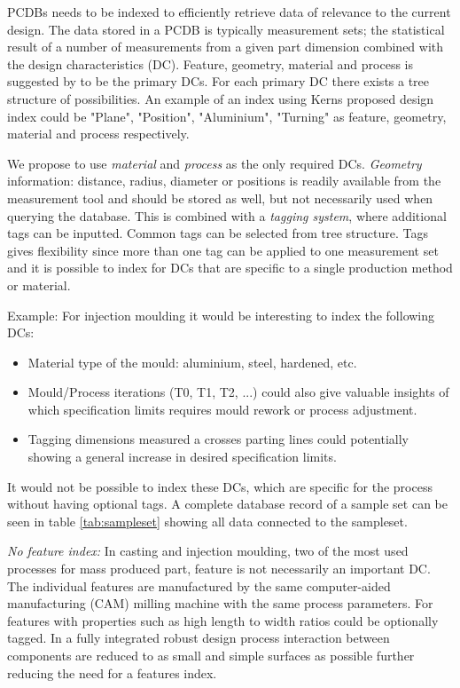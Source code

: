 \documentclass[aip,amsmath, reprint, author-year]{revtex4-1}
\begin{document}
PCDBs needs to be indexed to efficiently retrieve data of relevance to the current design. 
The data stored in a PCDB is typically measurement sets; the statistical result of a number of measurements from a given part dimension combined with the design characteristics (DC). 
Feature, geometry, material and process is suggested by \cite{kern2003forecasting} to be the primary DCs. 
For each primary DC there exists a tree structure of possibilities. An example of an index using Kerns proposed design index could be "Plane", "Position", "Aluminium", "Turning" as feature, geometry, material and process respectively. 

We propose to use \emph{material} and \emph{process} as the only required DCs. 
\emph{Geometry} information: distance, radius, diameter or positions is readily available from the measurement tool and should be stored as well, but not necessarily used when querying the database.
This is combined with a \emph{tagging system}, where additional tags can be inputted. 
Common tags can be selected from tree structure. 
Tags gives flexibility since more than one tag can be applied to one measurement set and it is possible to index for DCs that are specific to a single production method or material. 

Example: For injection moulding it would be interesting to index the following DCs:
\begin{itemize}
\item Material type of the mould: aluminium, steel, hardened, etc.
\item Mould/Process iterations (T0, T1, T2, ...) could also give valuable insights of which specification limits requires mould rework or process adjustment. 
\item Tagging dimensions measured a crosses parting lines could potentially showing a general increase in desired specification limits.
\end{itemize}
It would not be possible to index these DCs, which are specific for the process without having optional tags. 
A complete database record of a sample set can be seen in table \ref{tab:sampleset} showing all data connected to the sampleset. 

\emph{No feature index:}
In casting and injection moulding, two of the most used processes for mass produced part, feature is not necessarily an important DC. 
The individual features are manufactured by the same computer-aided manufacturing (CAM) milling machine with the same process parameters. 
For features with properties such as high length to width ratios could be optionally tagged. 
In a fully integrated robust design process interaction between components are reduced to as small and simple surfaces as possible further reducing the need for a features index.
\end{document}
